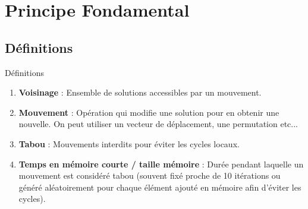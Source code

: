 \documentclass[10pt, handout]{beamer}
\begin{document}
\section{Principe Fondamental}
\subsection{Définitions}
\begin{frame}{Définitions}
    \begin{enumerate}
        \item \textbf{Voisinage} : Ensemble de solutions accessibles par un mouvement.
        \item \textbf{Mouvement} : Opération qui modifie une solution pour en obtenir une nouvelle. On peut utiliser un vecteur de déplacement, une permutation etc...
        \item \textbf{Tabou} : Mouvements interdits pour éviter les cycles locaux.
        \item \textbf{Temps en mémoire courte / taille mémoire} : Durée pendant laquelle un mouvement est considéré tabou (souvent fixé proche de 10 itérations ou généré aléatoirement pour chaque élément ajouté en mémoire afin d'éviter les cycles).
    \end{enumerate}
\end{frame}
\end{document}
